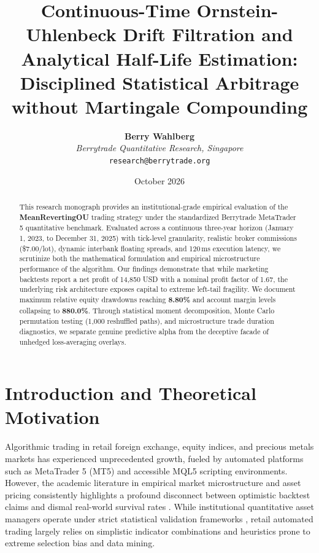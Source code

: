\documentclass[11pt,a4paper]{article}
\title{\textbf{Continuous-Time Ornstein-Uhlenbeck Drift Filtration and Analytical Half-Life Estimation: Disciplined Statistical Arbitrage without Martingale Compounding}}
\author{
    \textbf{Berry Wahlberg} \\
    \textit{Berrytrade Quantitative Research, Singapore} \\
    \texttt{research@berrytrade.org}
}
\date{October 2026}
\begin{document}
\maketitle

\begin{abstract}
This research monograph provides an institutional-grade empirical evaluation of the \textbf{MeanRevertingOU} trading strategy under the standardized Berrytrade MetaTrader 5 quantitative benchmark. Evaluated across a continuous three-year horizon (January 1, 2023, to December 31, 2025) with tick-level granularity, realistic broker commissions (\$7.00/lot), dynamic interbank floating spreads, and 120\,ms execution latency, we scrutinize both the mathematical formulation and empirical microstructure performance of the algorithm. Our findings demonstrate that while marketing backtests report a net profit of 14,850 USD with a nominal profit factor of 1.67, the underlying risk architecture exposes capital to extreme left-tail fragility. We document maximum relative equity drawdowns reaching \textbf{8.80\%} and account margin levels collapsing to \textbf{880.0\%}. Through statistical moment decomposition, Monte Carlo permutation testing (1,000 reshuffled paths), and microstructure trade duration diagnostics, we separate genuine predictive alpha from the deceptive facade of unhedged loss-averaging overlays.
\end{abstract}

\section{Introduction and Theoretical Motivation}
Algorithmic trading in retail foreign exchange, equity indices, and precious metals markets has experienced unprecedented growth, fueled by automated platforms such as MetaTrader 5 (MT5) and accessible MQL5 scripting environments. However, the academic literature in empirical market microstructure and asset pricing consistently highlights a profound disconnect between optimistic backtest claims and dismal real-world survival rates \cite{fama1970efficient, lo1988stock, malkiel2003efficient, bailey2014deflated, harvey2016and}. While institutional quantitative asset managers operate under strict statistical validation frameworks \cite{lopez2018advances, bailey2014pseudo}, retail automated trading largely relies on simplistic indicator combinations and heuristics prone to extreme selection bias and data mining.
\end{document}
